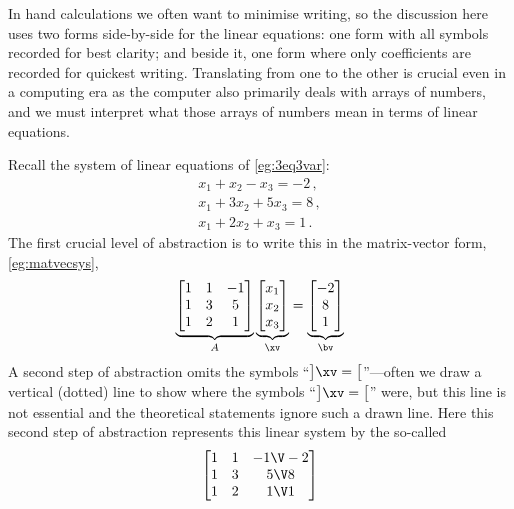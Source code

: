 In hand calculations we often want to minimise writing, so the discussion here uses two forms side-by-side for the linear equations: one form with all symbols recorded for best clarity; and beside it, one form where only coefficients are recorded for quickest writing.
Translating from one to the other is crucial even in a computing era as the computer also primarily deals with arrays of numbers, and we must interpret what those arrays of numbers mean in terms of linear equations.

\begin{example} \label{eg:}
Recall the system of linear equations of \autoref{eg:3eq3var}:
\begin{equation*}
\begin{array}{l}
x_1+x_2-x_3=-2\,,\\
x_1+3x_2+5x_3=8\,,\\
x_1+2x_2+x_3=1\,.
\end{array}
\end{equation*}
The first crucial level of abstraction is to write this in the matrix-vector form, \autoref{eg:matvecsys},
\begin{equation*}
\underbrace{\begin{bmatrix} 1&1&-1\\ 1&3&5\\1&2&1 \end{bmatrix}}_A
\underbrace{\begin{bmatrix} x_1\\x_2\\x_3 \end{bmatrix}}_\xv
=\underbrace{\begin{bmatrix} -2\\8\\1 \end{bmatrix}}_\bv 
\end{equation*}
A second step of abstraction omits the symbols ``\(\big]\xv=\big[\)''---often we draw a vertical (dotted) line to show where the symbols ``\(\big]\xv=\big[\)'' were, but this line is not essential and the theoretical statements ignore such a drawn line.
Here this second step of abstraction represents this linear system by the so-called 
\begin{equation*}
\begin{bmatrix} 1&1&-1\V -2\\ 1&3&5\V 8\\1&2&1\V 1 \end{bmatrix}
\end{equation*}
\end{example}


